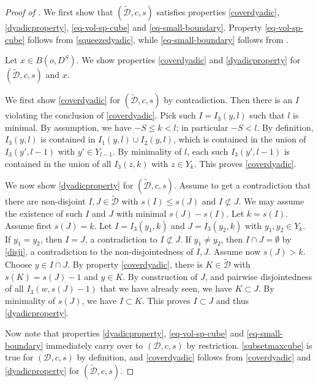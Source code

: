 \begin{proof}[Proof of ]
We first show that $(\tilde{\mathcal{D}},c,s)$ satisfies properties \eqref{coverdyadic}, \eqref{dyadicproperty}, \eqref{eq-vol-sp-cube} and \eqref{eq-small-boundary}. Property \eqref{eq-vol-sp-cube}
follows from \eqref{squeezedyadic}, while \eqref{eq-small-boundary} follows from .

Let $x\in B(o, D^S)$.
We show properties
\eqref{coverdyadic} and
\eqref{dyadicproperty}
for $(\tilde{\mathcal{D}},c,s)$ and $x$.

We first show \eqref{coverdyadic} for $(\tilde{\mathcal{D}},c,s)$ by contradiction. Then there is an $I$ violating the conclusion of
\eqref{coverdyadic}. Pick such $I=I_3(y,l)$ such that $l$ is minimal.
{By assumption, we have $-S\le k<l$; in particular $-S<l$}.
By definition, $I_3(y, l)$ is contained in $I_1(y, l)\cup I_2(y, l)$, which is contained in the union of $I_3(y',l-1)$ with $y'\in Y_{l-1}$.
By minimality of $l$, each such $I_3(y',l-1)$ is contained in the union of
all $I_3(z,k)$ with $z\in Y_k$. This proves \eqref{coverdyadic}.

We now show \eqref{dyadicproperty} for $(\tilde{\mathcal{D}},c,s)$. Assume to get a contradiction that
there are non-disjoint $I, J\in \tilde{\mathcal{D}}$ with $s(I)\le s(J)$
and $I \not \subset J$. We may assume the existence of such $I$ and $J$ with minimal
$s(J)-s(I)$. Let $k=s(I)$. Assume first $s(J)=k$. Let $I=I_3(y_1,k)$ and $J=I_3(y_2,k)$ with $y_1,y_2\in Y_k$.
If $y_1=y_2$, then $I=J$, a contradiction to $I\not \subset J$.
If $y_1\neq y_2$, then $I\cap J=\emptyset$ by \eqref{disji}, a contradiction to the non-disjointedness of $I,J$.
Assume now $s(J)>k$. Choose $y\in I\cap J$. By property \eqref{coverdyadic},
there is $K\in \tilde{\mathcal{D}}$ with $s(K)=s(J)-1$ and $y\in K$. By construction
of $J$, and pairwise disjointedness of all $I_3(w,s(J)-1)$ that we have already seen,
we have $K\subset J$. By minimality of $s(J)$, we have $I\subset K$.
This proves $I\subset J$ and thus \eqref{dyadicproperty}.

Now note that properties \eqref{dyadicproperty}, \eqref{eq-vol-sp-cube} and \eqref{eq-small-boundary} immediately carry over to $(\mathcal{D},c, s)$ by restriction. \eqref{subsetmaxcube} is true for $(\mathcal{D}, c, s)$ by definition, and \eqref{coverdyadic} follows from \eqref{coverdyadic} and \eqref{dyadicproperty} for $(\tilde{\mathcal{D}}, c, s)$.
\end{proof}

